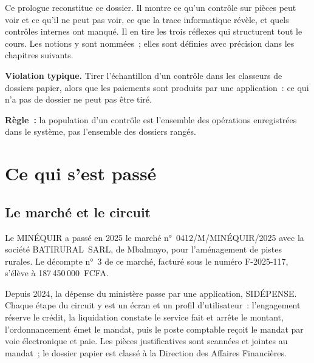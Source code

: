 \medskip

Ce prologue reconstitue ce dossier. Il montre ce qu'un contrôle sur pièces
peut voir et ce qu'il ne peut pas voir, ce que la trace informatique
révèle, et quels contrôles internes ont manqué. Il en tire les trois
réflexes qui structurent tout le cours. Les notions y sont nommées~; elles
sont définies avec précision dans les chapitres suivants.

\begin{boxalert}
\textbf{Violation typique.} Tirer l'échantillon d'un contrôle dans les
classeurs de dossiers papier, alors que les paiements sont produits par une
application~: ce qui n'a pas de dossier ne peut pas être tiré.

\smallskip
\textbf{Règle~:} la population d'un contrôle est l'ensemble des opérations
enregistrées dans le système, pas l'ensemble des dossiers rangés.
\end{boxalert}

\separateur

\section{Ce qui s'est passé}
\label{sec:pro-chronologie}

\subsection{Le marché et le circuit}

Le MINÉQUIR a passé en 2025 le marché n°~0412/M/MINÉQUIR/2025 avec la
société BATIRURAL~SARL, de Mbalmayo, pour l'aménagement de pistes rurales.
Le décompte n°~3 de ce marché, facturé sous le numéro F-2025-117, s'élève
à 187\,450\,000~FCFA.

Depuis 2024, la dépense du ministère passe par une application, SIDÉPENSE.
Chaque étape du circuit y est un écran et un profil d'utilisateur~:
l'engagement réserve le crédit, la liquidation constate le service fait et
arrête le montant, l'ordonnancement émet le mandat, puis le poste comptable
reçoit le mandat par voie électronique et paie. Les pièces justificatives
sont scannées et jointes au mandat~; le dossier papier est classé à la
Direction des Affaires Financières.

